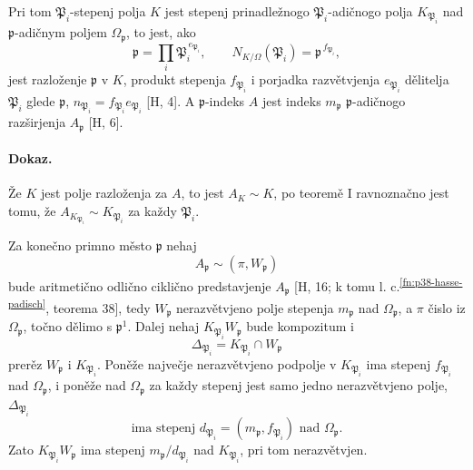 \documentclass[11pt]{article}
\begin{document}
Pri tom \( \mathfrak P_i\)-stepenj polja \(K\) jest stepenj prinadležnogo \( \mathfrak P_i\)-adičnogo polja \(K_{\mathfrak P_i}\) nad \( \mathfrak p\)-adičnym poljem \(\Omega_{\mathfrak p}\), to jest, ako
\[
\mathfrak p=\prod_i \mathfrak P_i^{\,e_{\mathfrak P_i}},
        \qquad N_{K/\Omega}(\mathfrak P_i)=\mathfrak p^{\,f_{\mathfrak P_i}},
\]
jest razloženje \(\mathfrak p\) v \(K\), produkt stepenja \(f_{\mathfrak P_i}\) i porjadka razvětvjenja \(e_{\mathfrak P_i}\) dělitelja \(\mathfrak P_i\) glede \(\mathfrak p\), \(n_{\mathfrak P_i}=f_{\mathfrak P_i}e_{\mathfrak P_i}\) [H, 4]. A \( \mathfrak p\)-indeks \(A\) jest indeks \(m_{\mathfrak p}\) \( \mathfrak p\)-adičnogo razširjenja \(A_{\mathfrak p}\) [H, 6].

\paragraph{Dokaz.}
Že \(K\) jest polje razloženja za \(A\), to jest \(A_K\sim K\), po teoremě I ravnoznačno jest tomu, že \(A_{K_{\mathfrak P_i}}\sim K_{\mathfrak P_i}\) za každy \(\mathfrak P_i\).

Za konečno primno město \(\mathfrak p\) nehaj
\[
        A_{\mathfrak p}\sim(\pi,W_{\mathfrak p})
\]
bude aritmetično odlično ciklično predstavjenje \(A_{\mathfrak p}\) [H, 16; k tomu l. c.\textsuperscript{\ref{fn:p38-hasse-padisch}}, teorema 38], tedy \(W_{\mathfrak p}\) nerazvětvjeno polje stepenja \(m_{\mathfrak p}\) nad \(\Omega_{\mathfrak p}\), a \(\pi\) čislo iz \(\Omega_{\mathfrak p}\), točno dělimo s \(\mathfrak p^1\). Dalej nehaj \(K_{\mathfrak P_i}W_{\mathfrak p}\) bude kompozitum i
\[
        \Delta_{\mathfrak P_i}=K_{\mathfrak P_i}\cap W_{\mathfrak p}
\]
prerěz \(W_{\mathfrak p}\) i \(K_{\mathfrak P_i}\). Poněže največje nerazvětvjeno podpolje v \(K_{\mathfrak P_i}\) ima stepenj \(f_{\mathfrak P_i}\) nad \(\Omega_{\mathfrak p}\), i poněže nad \(\Omega_{\mathfrak p}\) za každy stepenj jest samo jedno nerazvětvjeno polje, \(\Delta_{\mathfrak P_i}\)
\[
        \text{ima stepenj }d_{\mathfrak P_i}=(m_{\mathfrak p},f_{\mathfrak P_i})\text{ nad }\Omega_{\mathfrak p}.
\]
Zato \(K_{\mathfrak P_i}W_{\mathfrak p}\) ima stepenj \(m_{\mathfrak p}/d_{\mathfrak P_i}\) nad \(K_{\mathfrak P_i}\), pri tom nerazvětvjen.
\end{document}
